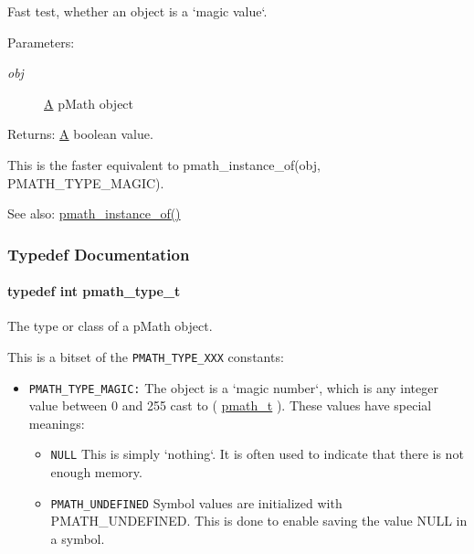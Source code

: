 Fast test, whether an object is a `magic value`. 

\begin{Desc}
\item[Parameters:]
\begin{description}
\item[{\em obj}]\hyperlink{class_a}{A} pMath object \end{description}
\end{Desc}
\begin{Desc}
\item[Returns:]\hyperlink{class_a}{A} boolean value.\end{Desc}
This is the faster equivalent to pmath\_\-instance\_\-of(obj, PMATH\_\-TYPE\_\-MAGIC).

\begin{Desc}
\item[See also:]\hyperlink{classpmath__t_0bd527f1ec2db8f1eba58e1fd84babbc}{pmath\_\-instance\_\-of()} \end{Desc}


\subsubsection{Typedef Documentation}
\hypertarget{group__objects_ge2646df76dcb0113715322b13a1f36f0}{
\paragraph[{pmath\_\-type\_\-t}]{\setlength{\rightskip}{0pt plus 5cm}typedef int {\bf pmath\_\-type\_\-t}}\hfill}
\label{group__objects_ge2646df76dcb0113715322b13a1f36f0}


The type or class of a pMath object. 

This is a bitset of the {\tt PMATH\_\-TYPE\_\-XXX} constants:

\begin{itemize}
\item {\tt PMATH\_\-TYPE\_\-MAGIC:} The object is a `magic number`, which is any integer value between 0 and 255 cast to ( \hyperlink{classpmath__t}{pmath\_\-t} ). These values have special meanings:\begin{itemize}
\item {\tt NULL} This is simply `nothing`. It is often used to indicate that there is not enough memory.\item {\tt PMATH\_\-UNDEFINED} Symbol values are initialized with PMATH\_\-UNDEFINED. This is done to enable saving the value NULL in a symbol.\end{itemize}
\end{itemize}


